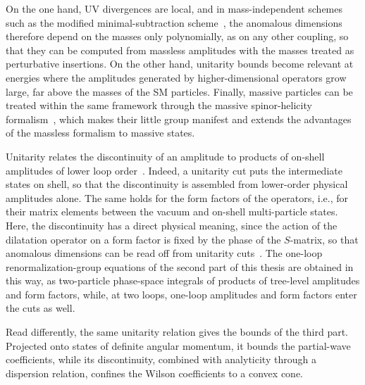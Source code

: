 On the one hand, UV divergences are local, and
in mass-independent schemes such as the modified minimal-subtraction scheme~\cite{tHooft:1973mfk,Weinberg:1973xwm,Bardeen:1978yd},
the anomalous dimensions therefore depend on the masses only polynomially, as on any other coupling,
so that they can be computed from massless amplitudes with the masses treated as perturbative
insertions. On the other hand, unitarity bounds become relevant at energies where the amplitudes
generated by higher-dimensional operators grow large, far above the masses of the SM
particles. Finally, massive particles can be treated within the same framework through the massive
spinor-helicity formalism~\cite{Arkani-Hamed:2017jhn}, 
which makes their little group manifest and extends the advantages of the massless formalism to massive states.

Unitarity relates the discontinuity of an amplitude to products of on-shell amplitudes of lower loop
order~\cite{Bern:1994zx,Bern:1994cg,Britto:2004nc}. Indeed, a unitarity cut puts the intermediate
states on shell, so that the discontinuity is assembled from lower-order physical amplitudes alone.
The same holds for the form factors of the operators, i.e., for their matrix elements between the
vacuum and on-shell multi-particle states. Here, the discontinuity has a direct physical meaning,
since the action of the dilatation operator on a form factor is fixed by the phase of the
$S$-matrix, so that anomalous dimensions can be read off from unitarity
cuts~\cite{Caron-Huot:2016cwu,EliasMiro:2020tdv,Baratella:2020lzz,Jiang:2020mhe,Bern:2020ikv}. The
one-loop renormalization-group equations of the second part of this thesis are obtained in this way,
as two-particle phase-space integrals of products of tree-level amplitudes and form factors, while,
at two loops, one-loop amplitudes and form factors enter the cuts as well. 

Read differently, the same
unitarity relation gives the bounds of the third part. Projected onto states of definite angular
momentum, it bounds the partial-wave coefficients, while its discontinuity, combined with
analyticity through a dispersion relation, confines the Wilson coefficients to a convex cone.

